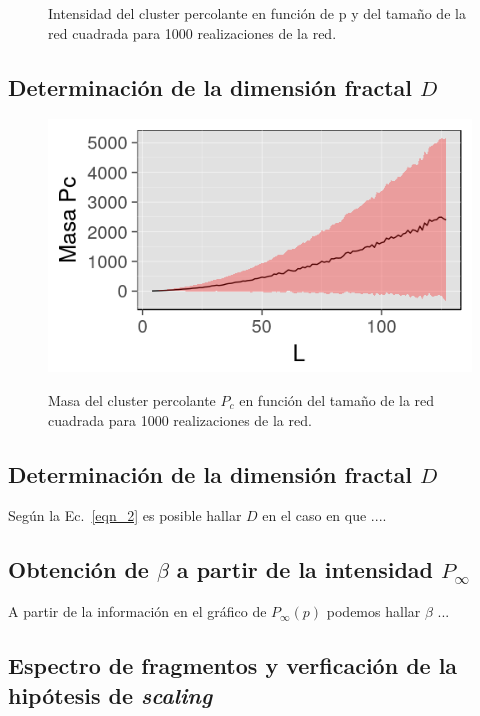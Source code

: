 \documentclass[%
 reprint,
 amsmath,amssymb,
 aps,
spanish]{revtex4-1}
\begin{document}
\begin{figure}[h]
\begin{subfigure}{.25\textwidth}
  \label{fig:2128x128}
\end{subfigure}
\caption{Intensidad del cluster percolante en función de p y del tamaño de la red cuadrada para 1000 realizaciones de la red.}
\label{fig:2}
\end{figure}

\subsection{\label{3} Determinaci\'on de la dimensi\'on fractal $D$ }

\begin{figure}[h]
  \centering
  \includegraphics[width=.9\linewidth]{ej3/masa}
  \label{fig:2masa}
\caption{Masa del cluster percolante $P_c$ en función del tamaño de la red cuadrada para 1000 realizaciones de la red.}
\label{fig:3}
\end{figure}


\subsection{\label{D} Determinaci\'on de la dimensi\'on fractal $D$ }

Seg\'un la Ec.~\ref{eqn_2} es posible hallar $D$ en el caso en que ....

\subsection{\label{P} Obtenci\'on de $\beta$ a partir de la intensidad $P_\infty$}

A partir de la informaci\'on en el gr\'afico de $P_\infty(p)$ podemos hallar $\beta$ ...

\subsection{\label{S} Espectro de fragmentos y verficaci\'on de la hip\'otesis de \emph{scaling} }
\end{document}
